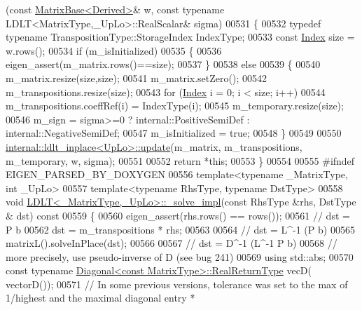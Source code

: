 \begin{DoxyCode}
      (\textcolor{keyword}{const} \hyperlink{group___core___module_class_eigen_1_1_matrix_base}{MatrixBase<Derived>}& w, \textcolor{keyword}{const} \textcolor{keyword}{typename} LDLT<MatrixType,\_UpLo>::RealScalar& sigma)
00531 \{
00532   \textcolor{keyword}{typedef} \textcolor{keyword}{typename} TranspositionType::StorageIndex IndexType;
00533   \textcolor{keyword}{const} \hyperlink{group___cholesky___module_ad9c57eb2fb3bbccd51b9d2e111bea355}{Index} size = w.rows();
00534   \textcolor{keywordflow}{if} (m\_isInitialized)
00535   \{
00536     eigen\_assert(m\_matrix.rows()==size);
00537   \}
00538   \textcolor{keywordflow}{else}
00539   \{
00540     m\_matrix.resize(size,size);
00541     m\_matrix.setZero();
00542     m\_transpositions.resize(size);
00543     \textcolor{keywordflow}{for} (\hyperlink{group___cholesky___module_ad9c57eb2fb3bbccd51b9d2e111bea355}{Index} i = 0; i < size; i++)
00544       m\_transpositions.coeffRef(i) = IndexType(i);
00545     m\_temporary.resize(size);
00546     m\_sign = sigma>=0 ? internal::PositiveSemiDef : internal::NegativeSemiDef;
00547     m\_isInitialized = \textcolor{keyword}{true};
00548   \}
00549 
00550   \hyperlink{struct_eigen_1_1internal_1_1ldlt__inplace}{internal::ldlt\_inplace<UpLo>::update}(m\_matrix, m\_transpositions, 
      m\_temporary, w, sigma);
00551 
00552   \textcolor{keywordflow}{return} *\textcolor{keyword}{this};
00553 \}
00554 
00555 \textcolor{preprocessor}{#ifndef EIGEN\_PARSED\_BY\_DOXYGEN}
00556 \textcolor{keyword}{template}<\textcolor{keyword}{typename} \_MatrixType, \textcolor{keywordtype}{int} \_UpLo>
00557 \textcolor{keyword}{template}<\textcolor{keyword}{typename} RhsType, \textcolor{keyword}{typename} DstType>
00558 \textcolor{keywordtype}{void} \hyperlink{group___cholesky___module_class_eigen_1_1_l_d_l_t}{LDLT<\_MatrixType,\_UpLo>::\_solve\_impl}(\textcolor{keyword}{const} RhsType &rhs, DstType &
      dst)\textcolor{keyword}{ const}
00559 \textcolor{keyword}{}\{
00560   eigen\_assert(rhs.rows() == rows());
00561   \textcolor{comment}{// dst = P b}
00562   dst = m\_transpositions * rhs;
00563 
00564   \textcolor{comment}{// dst = L^-1 (P b)}
00565   matrixL().solveInPlace(dst);
00566 
00567   \textcolor{comment}{// dst = D^-1 (L^-1 P b)}
00568   \textcolor{comment}{// more precisely, use pseudo-inverse of D (see bug 241)}
00569   \textcolor{keyword}{using} std::abs;
00570   \textcolor{keyword}{const} \textcolor{keyword}{typename} \hyperlink{group___core___module_class_eigen_1_1_diagonal}{Diagonal<const MatrixType>::RealReturnType} vecD(
      vectorD());
00571   \textcolor{comment}{// In some previous versions, tolerance was set to the max of 1/highest and the maximal diagonal entry *
}
\end{DoxyCode}
